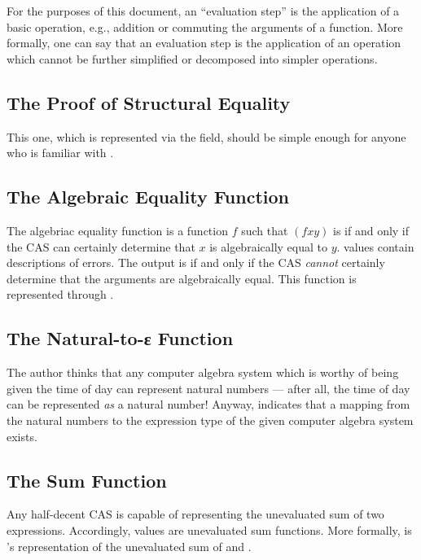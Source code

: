 \documentclass{report}
\begin{document}
For the purposes of this document, an ``evaluation step'' is the application of a basic operation, e.g., addition or commuting the arguments of a function.  More formally, one can say that an evaluation step is the application of an operation which cannot be further simplified or decomposed into simpler operations.

\subsection{The Proof of Structural Equality}
This one, which is represented via the  field, should be simple enough for anyone who is familiar with .

\subsection{The Algebraic Equality Function}
The algebriac equality function is a function \(f\) such that \(\left(f x y\right)\) is   if and only if the CAS can certainly determine that \(x\) is algebraically equal to \(y\).   values contain descriptions of errors.  The output is   if and only if the CAS \emph{cannot} certainly determine that the arguments are algebraically equal.  This function is represented through .

\subsection{The Natural-to-ε Function}
The author thinks that any computer algebra system which is worthy of being given the time of day can represent natural numbers --- after all, the time of day can be represented \emph{as} a natural number!  Anyway,  indicates that a mapping from the natural numbers to the expression type of the given computer algebra system exists.

\subsection{The Sum Function}
Any half-decent CAS is capable of representing the unevaluated sum of two expressions.  Accordingly,  values are unevaluated sum functions.  More formally,     is 's representation of the unevaluated sum of  and .
\end{document}

